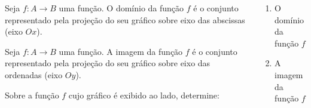 \begin{frame}
  \begin{columns}[onlytextwidth]
    \begin{column}{0.49\textwidth}
      \begin{theorem}
        Seja $f:A\rightarrow B$ uma função. O domínio da função $f$ é o conjunto representado pela projeção do seu gráfico sobre eixo das abscissas (eixo $Ox$).
      \end{theorem}
      \begin{theorem}
        Seja $f:A\rightarrow B$ uma função. A imagem da função $f$ é o conjunto representado pela projeção do seu gráfico sobre eixo das ordenadas (eixo $Oy$).
      \end{theorem}
      \begin{example-highlight}
        Sobre a função $f$ cujo gráfico é exibido ao lado, determine:
      \end{example-highlight}
    \end{column}
    \begin{column}{0.49\textwidth}
      \begin{highlight}
        \begin{enumerate}
          \item O domínio da função $f$
          \item A imagem da função $f$
        \end{enumerate}
      \end{highlight}
      \vspace*{-0.25cm}
      \begin{figure}
      \end{figure}
    \end{column}
  \end{columns}
\end{frame}

